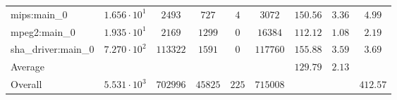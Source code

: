 \begin{tabular}{|l|c|c|c|c|c|c|c|c|}
mips:main\_0            & $ 1.656 \cdot 10^{1}  $ & $ 2493   $ & $ 727   $ & $ 4   $ & $ 3072   $ & $ 150.56      $ & $ 3.36    $ & $ 4.99    $ \\
mpeg2:main\_0           & $ 1.935 \cdot 10^{1}  $ & $ 2169   $ & $ 1299  $ & $ 0   $ & $ 16384  $ & $ 112.12      $ & $ 1.08    $ & $ 2.19    $ \\
sha\_driver:main\_0     & $ 7.270 \cdot 10^{2}  $ & $ 113322 $ & $ 1591  $ & $ 0   $ & $ 117760 $ & $ 155.88      $ & $ 3.59    $ & $ 3.69    $ \\
\hline
Average                 & $                     $ & $        $ & $       $ & $     $ & $        $ & $ 129.79      $ & $ 2.13    $ & $         $ \\
\hline
Overall                 & $ 5.531 \cdot 10^{3}  $ & $ 702996 $ & $ 45825 $ & $ 225 $ & $ 715008 $ & $             $ & $         $ & $ 412.57  $ \\
\hline
\end{tabular}
